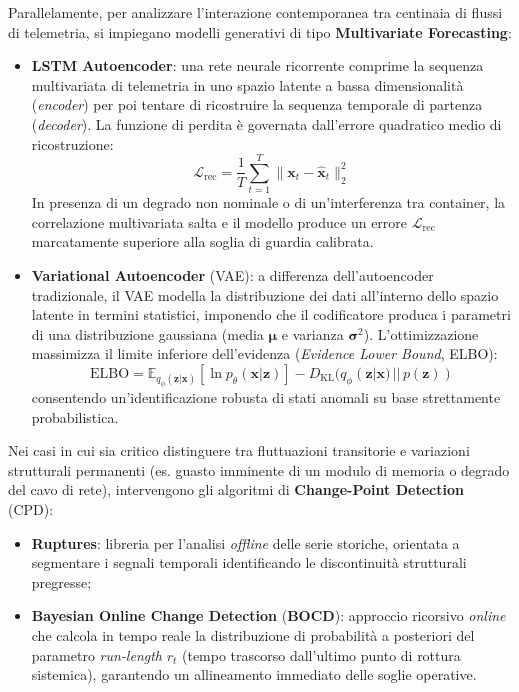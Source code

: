 \documentclass[11pt, a4paper]{article}
\begin{document}
Parallelamente, per analizzare l'interazione contemporanea tra centinaia di flussi di telemetria, si impiegano modelli generativi di tipo \textbf{Multivariate Forecasting}:
\begin{itemize}
    \item \textbf{LSTM Autoencoder}: una rete neurale ricorrente comprime la sequenza multivariata di telemetria in uno spazio latente a bassa dimensionalità (\emph{encoder}) per poi tentare di ricostruire la sequenza temporale di partenza (\emph{decoder}). La funzione di perdita è governata dall'errore quadratico medio di ricostruzione:
    \begin{equation}
        \mathcal{L}_{\text{rec}} = \frac{1}{T} \sum_{t=1}^T \lVert \bm{x}_t - \hat{\bm{x}}_t \rVert_2^2
    \end{equation}
    In presenza di un degrado non nominale o di un'interferenza tra container, la correlazione multivariata salta e il modello produce un errore $\mathcal{L}_{\text{rec}}$ marcatamente superiore alla soglia di guardia calibrata.
    \item \textbf{Variational Autoencoder} (VAE): a differenza dell'autoencoder tradizionale, il VAE modella la distribuzione dei dati all'interno dello spazio latente in termini statistici, imponendo che il codificatore produca i parametri di una distribuzione gaussiana (media $\bm{\mu}$ e varianza $\bm{\sigma}^2$). L'ottimizzazione massimizza il limite inferiore dell'evidenza (\emph{Evidence Lower Bound}, ELBO):
    \begin{equation}
        \text{ELBO} = \mathbb{E}_{q_\phi(\bm{z}|\bm{x})}[\ln p_\theta(\bm{x}|\bm{z})] - D_{\text{KL}}(q_\phi(\bm{z}|\bm{x}) \,||\, p(\bm{z}))
    \end{equation}
    consentendo un'identificazione robusta di stati anomali su base strettamente probabilistica.
\end{itemize}

Nei casi in cui sia critico distinguere tra fluttuazioni transitorie e variazioni strutturali permanenti (es. guasto imminente di un modulo di memoria o degrado del cavo di rete), intervengono gli algoritmi di \textbf{Change-Point Detection} (CPD):
\begin{itemize}
    \item \textbf{Ruptures}: libreria per l'analisi \emph{offline} delle serie storiche, orientata a segmentare i segnali temporali identificando le discontinuità strutturali pregresse;
    \item \textbf{Bayesian Online Change Detection} (\textbf{BOCD}): approccio ricorsivo \emph{online} che calcola in tempo reale la distribuzione di probabilità a posteriori del parametro \emph{run-length} $r_t$ (tempo trascorso dall'ultimo punto di rottura sistemica), garantendo un allineamento immediato delle soglie operative.
\end{itemize}
\end{document}
